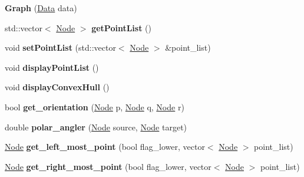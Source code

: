 \begin{DoxyCompactItemize}
\item 
\mbox{\label{classGraph_ad2e96f43e60cd916a3bccab231fc7570}} 
{\bfseries Graph} (\hyperlink{classData}{Data} data)
\item 
\mbox{\label{classGraph_a8231d26a14b98e1b745dc589206288f0}} 
std\+::vector$<$ \hyperlink{classNode}{Node} $>$ {\bfseries get\+Point\+List} ()
\item 
\mbox{\label{classGraph_ac3d8fd4be7db3fd814b68499322b9cba}} 
void {\bfseries set\+Point\+List} (std\+::vector$<$ \hyperlink{classNode}{Node} $>$ \&point\+\_\+list)
\item 
\mbox{\label{classGraph_af17d100a4c98374793b04f7eb57532d4}} 
void {\bfseries display\+Point\+List} ()
\item 
\mbox{\label{classGraph_a76a6670d6c92e56bfc20a3d581a633ff}} 
void {\bfseries display\+Convex\+Hull} ()
\item 
\mbox{\label{classGraph_a657f8174fb95bd7bfd99556cfb4cbd65}} 
bool {\bfseries get\+\_\+orientation} (\hyperlink{classNode}{Node} p, \hyperlink{classNode}{Node} q, \hyperlink{classNode}{Node} r)
\item 
\mbox{\label{classGraph_af62998005ee35671342b379af7400b1b}} 
double {\bfseries polar\+\_\+angler} (\hyperlink{classNode}{Node} source, \hyperlink{classNode}{Node} target)
\item 
\mbox{\label{classGraph_af87a876de5bf77e8acc6c1e646c48472}} 
\hyperlink{classNode}{Node} {\bfseries get\+\_\+left\+\_\+most\+\_\+point} (bool flag\+\_\+lower, vector$<$ \hyperlink{classNode}{Node} $>$ point\+\_\+list)
\item 
\mbox{\label{classGraph_ab57f27f64ee47cd5e9a49fdb6de85554}} 
\hyperlink{classNode}{Node} {\bfseries get\+\_\+right\+\_\+most\+\_\+point} (bool flag\+\_\+lower, vector$<$ \hyperlink{classNode}{Node} $>$ point\+\_\+list)
\item 
\mbox{\label{classGraph_a606f345b4d2a90c850733272db8f0936}} 

\end{DoxyCompactItemize}
